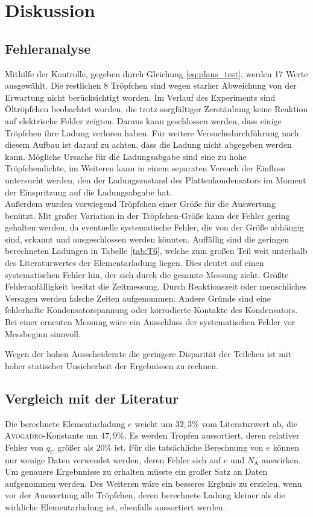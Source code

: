 \newpage
\section{Diskussion}
\label{sec:Diskussion}

\subsection{Fehleranalyse}
Mithilfe der Kontrolle, gegeben durch Gleichung \eqref{eq:plaus_test}, werden 17 Werte ausgewählt.
Die restlichen 8 Tröpfchen sind wegen starker Abweichung von der Erwartung nicht berücksichtigt worden.
Im Verlauf des Experiments sind Öltröpfchen beobachtet worden, die trotz sorgfältiger Zerstäubung keine Reaktion auf elektrische Felder zeigten. 
Daraus kann geschlossen werden, dass einige Tröpfchen ihre Ladung verloren haben.
Für weitere Versuchsdurchführung nach diesem Aufbau ist darauf zu achten, dass die Ladung nicht abgegeben werden kann.
Mögliche Ursache für die Ladungsabgabe sind eine zu hohe Tröpfchendichte,
im Weiteren kann in einem separaten Versuch der Einfluss untersucht werden, 
den der Ladungszustand des Plattenkondensators im Moment der Einspritzung auf die Ladungsabgabe hat.\\
Außerdem wurden vorwiegend Tröpfchen einer Größe für die Auswertung benützt.
Mit großer Variation in der Tröpfchen-Größe kann der Fehler gering gehalten werden, da eventuelle systematische Fehler, die von der Größe abhängig sind, erkannt und ausgeschlossen werden könnten.
Auffällig sind die geringen berechneten Ladungen in Tabelle \ref{tab:T6}, welche zum großen Teil weit unterhalb des Literaturwertes der Elementarladung liegen. Dies deutet auf einen systematischen Fehler hin, der sich durch die gesamte Messung zieht. Größte Fehleranfälligkeit besitzt die Zeitmessung. Durch Reaktionszeit oder menschliches Versagen werden falsche Zeiten aufgenommen. Andere Gründe sind eine fehlerhafte Kondensatorspannung oder korrodierte Kontakte des Kondensators. Bei einer erneuten Messung wäre ein Ausschluss der systematischen Fehler vor Messbeginn sinnvoll.

Wegen der hohen Ausscheiderate die geringere Disparität der Teilchen ist mit hoher statischer Unsicherheit der Ergebnissen zu rechnen.

\subsection{Vergleich mit der Literatur}
Die berechnete Elementarladung $e$ weicht um $32,3\%$ vom Literaturwert ab, die \textsc{Avogadro}-Konstante um $47,9\%$. 
Es werden Tropfen aussortiert, deren relativer Fehler von $q_\mathup{C}$ größer als $20\%$ ist. Für die tatsächliche Berechnung von $e$ können nur wenige Daten verwendet werden, deren Fehler sich auf $e$ und $N_\mathup{A}$ auswirken. Um genauere Ergebnnisse zu erhalten müsste ein großer Satz an Daten aufgenommen werden. Des Weiteren wäre ein besseres Ergbnis zu erzielen, wenn vor der Auswertung alle Tröpfchen, deren berechnete Ladung kleiner als die wirkliche Elementarladung ist, ebenfalls aussortiert werden.
